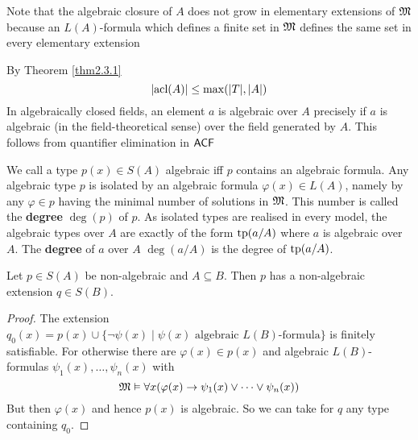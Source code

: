 \documentclass[11pt]{article}
\def \acl {\text{acl}}
\begin{document}
\begin{remark}
Note that the algebraic closure of \(A\) does not grow in elementary extensions of \(\mathfrak{M}\) because
an \(L(A)\)-formula which defines a finite set in \(\mathfrak{M}\) defines the same set in every elementary
extension
\end{remark}

By Theorem \ref{thm2.3.1}
\begin{equation*}
\abs{\acl(A)}\le\max(\abs{T},\abs{A})
\end{equation*}
In algebraically closed fields, an element \(a\) is algebraic over \(A\) precisely if \(a\) is
algebraic (in the field-theoretical sense) over the field generated by \(A\). This follows from
quantifier elimination in \(\textsf{ACF}\)

We call a type \(p(x)\in S(A)\) algebraic iff \(p\) contains an algebraic formula. Any algebraic
type \(p\) is isolated by an algebraic formula \(\varphi(x)\in L(A)\), namely by any \(\varphi\in p\) having the
minimal number of solutions in \(\mathfrak{M}\).
This number is called the \textbf{degree} \(\deg(p)\) of \(p\). As isolated types are realised in every
model, the algebraic types over \(A\) are exactly of the form \(\operatorname{tp}(a/A)\) where \(a\) is
algebraic over \(A\). The \textbf{degree} of \(a\) over \(A\) \(\deg(a/A)\) is the degree of \(\operatorname{tp}(a/A)\).

\begin{lemma}[]
\label{lemma5.6.2}
Let \(p\in S(A)\) be non-algebraic and \(A\subseteq B\). Then \(p\) has a non-algebraic extension \(q\in S(B)\).
\end{lemma}

\begin{proof}
The extension \(q_0(x)=p(x)\cup\{\neg\psi(x)\mid\psi(x)\text{ algebraic }L(B)\text{-formula}\}\) is finitely
satisfiable. For otherwise there are \(\varphi(x)\in p(x)\)
and algebraic \(L(B)\)-formulas \(\psi_1(x),\dots,\psi_n(x)\) with
\begin{equation*}
\mathfrak{M}\vDash\forall x(\varphi(x)\to\psi_1(x)\vee\dots\vee\psi_n(x))
\end{equation*}
But then \(\varphi(x)\)
and hence \(p(x)\) is algebraic. So we can take for \(q\) any type containing \(q_0\).
\end{proof}
\end{document}
